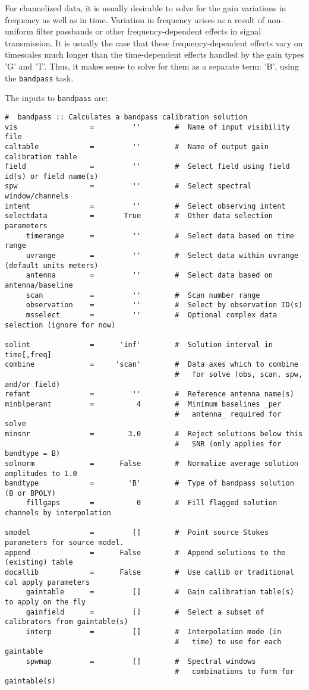 For channelized data, it is usually desirable to solve for the gain
variations in frequency as well as in time.  Variation in frequency
arises as a result of non-uniform filter passbands or other frequency-dependent
effects in signal transmission.  It is usually the case that these
frequency-dependent effects vary on timescales much longer than the
time-dependent effects handled by the gain types 'G' and 'T'.  
Thus, it makes sense to solve for them as a separate term: 'B', using the
{\tt bandpass} task.

The inputs to {\tt bandpass} are:
\small
\begin{verbatim}
#  bandpass :: Calculates a bandpass calibration solution
vis                 =         ''        #  Name of input visibility file
caltable            =         ''        #  Name of output gain calibration table
field               =         ''        #  Select field using field id(s) or field name(s)
spw                 =         ''        #  Select spectral window/channels
intent              =         ''        #  Select observing intent
selectdata          =       True        #  Other data selection parameters
     timerange      =         ''        #  Select data based on time range
     uvrange        =         ''        #  Select data within uvrange (default units meters)
     antenna        =         ''        #  Select data based on antenna/baseline
     scan           =         ''        #  Scan number range
     observation    =         ''        #  Select by observation ID(s)
     msselect       =         ''        #  Optional complex data selection (ignore for now)

solint              =      'inf'        #  Solution interval in time[,freq]
combine             =     'scan'        #  Data axes which to combine
                                        #   for solve (obs, scan, spw, and/or field)
refant              =         ''        #  Reference antenna name(s)
minblperant         =          4        #  Minimum baselines _per
                                        #   antenna_ required for solve
minsnr              =        3.0        #  Reject solutions below this
                                        #   SNR (only applies for bandtype = B)
solnorm             =      False        #  Normalize average solution amplitudes to 1.0
bandtype            =        'B'        #  Type of bandpass solution (B or BPOLY)
     fillgaps       =          0        #  Fill flagged solution channels by interpolation

smodel              =         []        #  Point source Stokes parameters for source model.
append              =      False        #  Append solutions to the (existing) table
docallib            =      False        #  Use callib or traditional cal apply parameters
     gaintable      =         []        #  Gain calibration table(s) to apply on the fly
     gainfield      =         []        #  Select a subset of calibrators from gaintable(s)
     interp         =         []        #  Interpolation mode (in
                                        #   time) to use for each gaintable
     spwmap         =         []        #  Spectral windows
                                        #   combinations to form for gaintable(s)


\end{verbatim}
